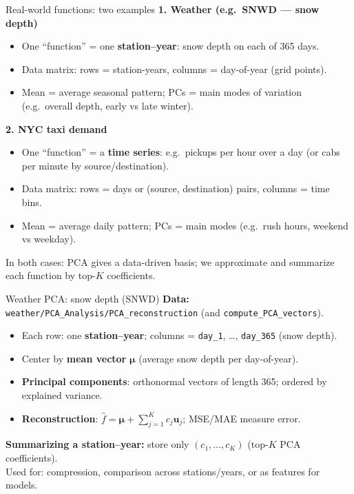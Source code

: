\documentclass[aspectratio=169]{beamer}
\begin{document}
\begin{frame}{Real-world functions: two examples}
  \small
  \textbf{1. Weather (e.g.\ SNWD — snow depth)}
  \begin{itemize}
    \item One ``function'' = one \textbf{station--year}: snow depth on each of 365 days.
    \item Data matrix: rows = station-years, columns = day-of-year (grid points).
    \item Mean = average seasonal pattern; PCs = main modes of variation (e.g.\ overall depth, early vs late winter).
  \end{itemize}
  \vspace{0.25cm}
  \textbf{2. NYC taxi demand}
  \begin{itemize}
    \item One ``function'' = a \textbf{time series}: e.g.\ pickups per hour over a day (or cabs per minute by source/destination).
    \item Data matrix: rows = days or (source, destination) pairs, columns = time bins.
    \item Mean = average daily pattern; PCs = main modes (e.g.\ rush hours, weekend vs weekday).
  \end{itemize}
  \vspace{0.15cm}
  In both cases: PCA gives a data-driven basis; we approximate and summarize each function by top-$K$ coefficients.
\end{frame}

\begin{frame}{Weather PCA: snow depth (SNWD)}
  \small
  \textbf{Data:} \texttt{weather/PCA\_Analysis/PCA\_reconstruction} (and \texttt{compute\_PCA\_vectors}).
  \begin{itemize}
    \item Each row: one \textbf{station--year}; columns = \texttt{day\_1}, \ldots, \texttt{day\_365} (snow depth).
    \item Center by \textbf{mean vector} $\boldsymbol{\mu}$ (average snow depth per day-of-year).
    \item \textbf{Principal components}: orthonormal vectors of length 365; ordered by explained variance.
    \item \textbf{Reconstruction}: $\widehat{f} = \boldsymbol{\mu} + \sum_{j=1}^K c_j \mathbf{u}_j$; MSE/MAE measure error.
  \end{itemize}
  \vspace{0.2cm}
  \textbf{Summarizing a station--year:} store only $(c_1, \ldots, c_K)$ (top-$K$ PCA coefficients).\\
  Used for: compression, comparison across stations/years, or as features for models.
\end{frame}
\end{document}
